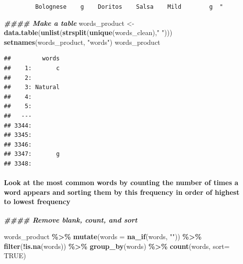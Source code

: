 \documentclass[
]{article}
\newenvironment{Shaded}{\begin{snugshade}}{\end{snugshade}}
\newcommand{\AttributeTok}[1]{\textcolor[rgb]{0.13,0.29,0.53}{#1}}
\newcommand{\ConstantTok}[1]{\textcolor[rgb]{0.56,0.35,0.01}{#1}}
\newcommand{\DocumentationTok}[1]{\textcolor[rgb]{0.56,0.35,0.01}{\textbf{\textit{#1}}}}
\newcommand{\FunctionTok}[1]{\textcolor[rgb]{0.13,0.29,0.53}{\textbf{#1}}}
\newcommand{\NormalTok}[1]{#1}
\newcommand{\OtherTok}[1]{\textcolor[rgb]{0.56,0.35,0.01}{#1}}
\newcommand{\SpecialCharTok}[1]{\textcolor[rgb]{0.81,0.36,0.00}{\textbf{#1}}}
\newcommand{\StringTok}[1]{\textcolor[rgb]{0.31,0.60,0.02}{#1}}
\begin{document}
\begin{verbatim}
         Bolognese    g    Doritos    Salsa    Mild        g  "
\end{verbatim}

\begin{Shaded}
\begin{Highlighting}[]
\DocumentationTok{\#\#\#\# Make a table}
\NormalTok{words\_product }\OtherTok{\textless{}{-}} \FunctionTok{data.table}\NormalTok{(}\FunctionTok{unlist}\NormalTok{(}\FunctionTok{strsplit}\NormalTok{(}\FunctionTok{unique}\NormalTok{(words\_clean),}\StringTok{" "}\NormalTok{)))}
\FunctionTok{setnames}\NormalTok{(words\_product, }\StringTok{"words"}\NormalTok{)}
\NormalTok{words\_product}
\end{Highlighting}
\end{Shaded}

\begin{verbatim}
##         words
##    1:       c
##    2:        
##    3: Natural
##    4:        
##    5:        
##   ---        
## 3344:        
## 3345:        
## 3346:        
## 3347:       g
## 3348:
\end{verbatim}

\hypertarget{look-at-the-most-common-words-by-counting-the-number-of-times-a-word-appears-and-sorting-them-by-this-frequency-in-order-of-highest-to-lowest-frequency}{%
\paragraph{Look at the most common words by counting the number of times
a word appears and sorting them by this frequency in order of highest to
lowest
frequency}\label{look-at-the-most-common-words-by-counting-the-number-of-times-a-word-appears-and-sorting-them-by-this-frequency-in-order-of-highest-to-lowest-frequency}}

\begin{Shaded}
\begin{Highlighting}[]
\DocumentationTok{\#\#\#\# Remove blank, count, and sort}

\NormalTok{words\_product }\SpecialCharTok{\%\textgreater{}\%}
\FunctionTok{mutate}\NormalTok{(}\AttributeTok{words =} \FunctionTok{na\_if}\NormalTok{(words, }\StringTok{""}\NormalTok{)) }\SpecialCharTok{\%\textgreater{}\%} 
    \FunctionTok{filter}\NormalTok{(}\SpecialCharTok{!}\FunctionTok{is.na}\NormalTok{(words)) }\SpecialCharTok{\%\textgreater{}\%}
    \FunctionTok{group\_by}\NormalTok{(words) }\SpecialCharTok{\%\textgreater{}\%}
    \FunctionTok{count}\NormalTok{(words, }\AttributeTok{sort=} \ConstantTok{TRUE}\NormalTok{)}
\end{Highlighting}
\end{Shaded}
\end{document}

